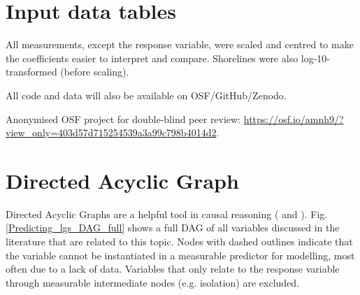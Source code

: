 \documentclass[unnumsec,webpdf,modern,medium]{oup-authoring-template}
\begin{document}
\begin{appendices}
\FloatBarrier

\section{Input data tables}
\singlespacing
\label{appendix_data tables}
All measurements, except the response variable, were scaled and centred to make the coefficients easier to interpret and compare. Shorelines were also log-10-transformed (before scaling). 

All code and data will also be available on OSF/GitHub/Zenodo.

Anonymised OSF project for double-blind peer review: \url{https://osf.io/amnh9/?view_only=403d57d715254539a3a99c798b4014d2}.

\begin{landscape}



\end{landscape}

\section{Directed Acyclic Graph}
\label{appendix_DAG_def}
Directed Acyclic Graphs are a helpful tool in causal reasoning (\citet{pearl1995causal} and \citet{mcelreath2020statistical}). Fig. \ref{Predicting_lgs_DAG_full} shows a full DAG of all variables discussed in the literature that are related to this topic. Nodes with dashed outlines indicate that the variable cannot be instantiated in a measurable predictor for modelling, most often due to a lack of data. Variables that only relate to the response variable through measurable intermediate nodes (e.g. isolation) are excluded.
 


\end{appendices}
\end{document}

